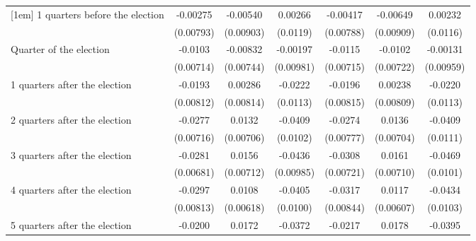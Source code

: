 \begin{table}[!ht]
\begin{tabular}{l*{6}{c}}
[1em]
 1 quarters before the election&    -0.00275         &    -0.00540         &     0.00266         &    -0.00417         &    -0.00649         &     0.00232         \\
                    &   (0.00793)         &   (0.00903)         &    (0.0119)         &   (0.00788)         &   (0.00909)         &    (0.0116)         \\
[1em]
Quarter of the election&     -0.0103         &    -0.00832         &    -0.00197         &     -0.0115         &     -0.0102         &    -0.00131         \\
                    &   (0.00714)         &   (0.00744)         &   (0.00981)         &   (0.00715)         &   (0.00722)         &   (0.00959)         \\
[1em]
 1 quarters after the election&     -0.0193\sym{*}  &     0.00286         &     -0.0222\sym{*}  &     -0.0196\sym{*}  &     0.00238         &     -0.0220         \\
                    &   (0.00812)         &   (0.00814)         &    (0.0113)         &   (0.00815)         &   (0.00809)         &    (0.0113)         \\
[1em]
 2 quarters after the election&     -0.0277\sym{***}&      0.0132         &     -0.0409\sym{***}&     -0.0274\sym{***}&      0.0136         &     -0.0409\sym{***}\\
                    &   (0.00716)         &   (0.00706)         &    (0.0102)         &   (0.00777)         &   (0.00704)         &    (0.0111)         \\
[1em]
 3 quarters after the election&     -0.0281\sym{***}&      0.0156\sym{*}  &     -0.0436\sym{***}&     -0.0308\sym{***}&      0.0161\sym{*}  &     -0.0469\sym{***}\\
                    &   (0.00681)         &   (0.00712)         &   (0.00985)         &   (0.00721)         &   (0.00710)         &    (0.0101)         \\
[1em]
 4 quarters after the election&     -0.0297\sym{***}&      0.0108         &     -0.0405\sym{***}&     -0.0317\sym{***}&      0.0117         &     -0.0434\sym{***}\\
                    &   (0.00813)         &   (0.00618)         &    (0.0100)         &   (0.00844)         &   (0.00607)         &    (0.0103)         \\
[1em]
 5 quarters after the election&     -0.0200\sym{**} &      0.0172         &     -0.0372\sym{**} &     -0.0217\sym{**} &      0.0178         &     -0.0395\sym{**} \\

\end{tabular}
\end{table}
